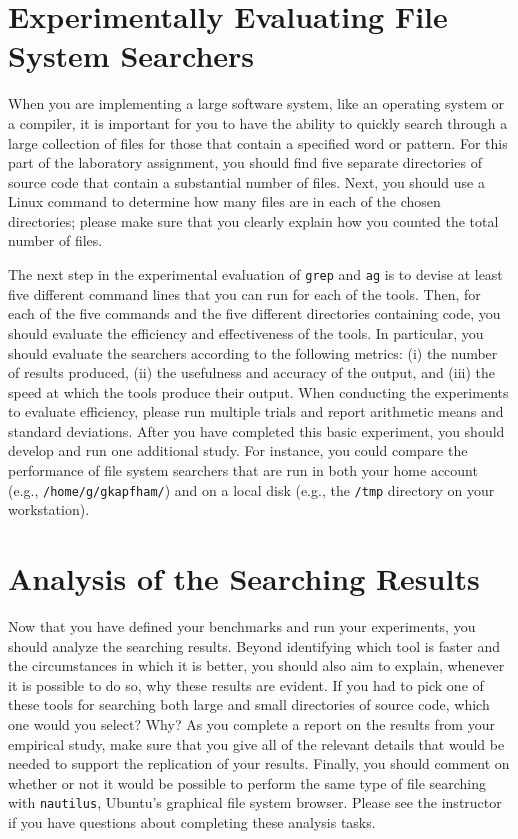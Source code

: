 \section*{Experimentally Evaluating File System Searchers}

When you are implementing a large software system, like an operating system or a compiler, it is important for you to have
the ability to quickly search through a large collection of files for those that contain a specified word or pattern.
For this part of the laboratory assignment, you should find five separate directories of source code that contain a
substantial number of files. Next, you should use a Linux command to determine how many files are in each of the chosen
directories; please make sure that you clearly explain how you counted the total number of files.

The next step in the experimental evaluation of {\tt grep} and {\tt ag} is to devise at least five different command
lines that you can run for each of the tools. Then, for each of the five commands and the five different directories
containing code, you should evaluate the efficiency and effectiveness of the tools. In particular, you should evaluate
the searchers according to the following metrics: (i) the number of results produced, (ii) the usefulness and accuracy
of the output, and (iii) the speed at which the tools produce their output. When conducting the experiments to evaluate
efficiency, please run multiple trials and report arithmetic means and standard deviations. After you have completed
this basic experiment, you should develop and run one additional study. For instance, you could compare the performance
of file system searchers that are run in both your home account (e.g., {\tt /home/g/gkapfham/}) and on a local disk
(e.g., the {\tt /tmp} directory on your workstation).

\section*{Analysis of the Searching Results}

Now that you have defined your benchmarks and run your experiments, you should analyze the searching results. Beyond
identifying which tool is faster and the circumstances in which it is better, you should also aim to explain, whenever
it is possible to do so, why these results are evident. If you had to pick one of these tools for searching both large
and small directories of source code, which one would you select? Why? As you complete a report on the results from your
empirical study, make sure that you give all of the relevant details that would be needed to support the replication of
your results. Finally, you should comment on whether or not it would be possible to perform the same type of file
searching with {\tt nautilus}, Ubuntu's graphical file system browser. Please see the instructor if you have questions
about completing these analysis tasks.

